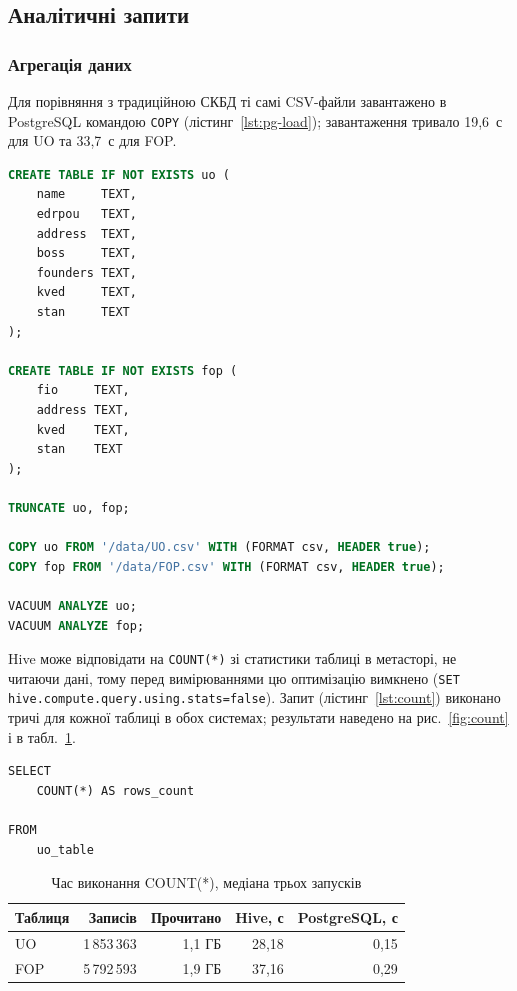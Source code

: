 \documentclass{iasa-lab}
\begin{document}

\subsection{Аналітичні запити}

\subsubsection{Агрегація даних}

Для порівняння з традиційною СКБД ті самі CSV-файли завантажено в PostgreSQL командою \texttt{COPY} (лістинг~\ref{lst:pg-load}); завантаження тривало 19,6~с для UO та 33,7~с для FOP.

\begin{lstlisting}[language=SQL, caption={Завантаження даних у PostgreSQL}, label={lst:pg-load}]
CREATE TABLE IF NOT EXISTS uo (
    name     TEXT,
    edrpou   TEXT,
    address  TEXT,
    boss     TEXT,
    founders TEXT,
    kved     TEXT,
    stan     TEXT
);

CREATE TABLE IF NOT EXISTS fop (
    fio     TEXT,
    address TEXT,
    kved    TEXT,
    stan    TEXT
);

TRUNCATE uo, fop;

COPY uo FROM '/data/UO.csv' WITH (FORMAT csv, HEADER true);
COPY fop FROM '/data/FOP.csv' WITH (FORMAT csv, HEADER true);

VACUUM ANALYZE uo;
VACUUM ANALYZE fop;
\end{lstlisting}

Hive може відповідати на \texttt{COUNT(*)} зі статистики таблиці в метасторі, не читаючи дані, тому перед вимірюваннями цю оптимізацію вимкнено (\texttt{SET hive.compute.query.using.stats=false}). Запит (лістинг~\ref{lst:count}) виконано тричі для кожної таблиці в обох системах; результати наведено на рис.~\ref{fig:count} і в табл.~\ref{tab:count}.

\begin{lstlisting}[language=HiveQL, caption={Підрахунок кількості записів}, label={lst:count}]
SELECT
    COUNT(*) AS rows_count

FROM
    uo_table
\end{lstlisting}


\begin{table}[H]
  \caption{Час виконання COUNT(*), медіана трьох запусків}\label{tab:count}
  \begin{tabularx}{\textwidth}{|X|r|r|r|r|}
    \hline
    Таблиця & Записів & Прочитано & Hive, с & PostgreSQL, с \\
    \hline
    UO  & 1\,853\,363 & 1,1 ГБ & 28,18 & 0,15 \\
    FOP & 5\,792\,593 & 1,9 ГБ & 37,16 & 0,29 \\
    \hline
  \end{tabularx}
\end{table}
\end{document}
